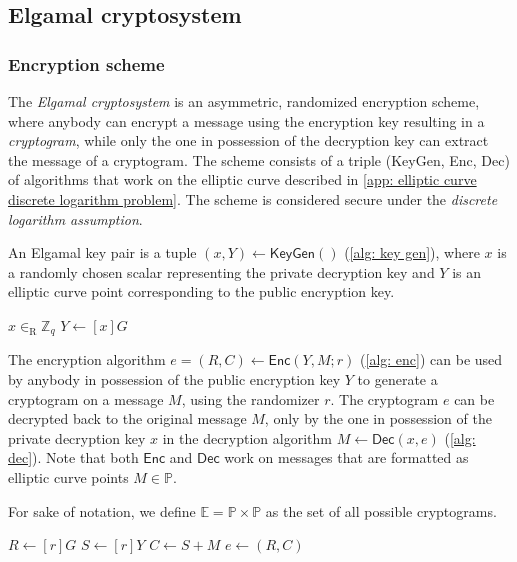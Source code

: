 \subsection{Elgamal cryptosystem} \label{app: elgamal cryptosystem}


\subsubsection{Encryption scheme} \label{app: encryption scheme}
The \textit{Elgamal cryptosystem} is an asymmetric, randomized encryption scheme, where anybody can encrypt a message using the encryption key resulting in a \textit{cryptogram}, while only the one in possession of the decryption key can extract the message of a cryptogram. The scheme consists of a triple (\textsf{KeyGen}, \textsf{Enc}, \textsf{Dec}) of algorithms that work on the elliptic curve described in \cref{app: elliptic curve discrete logarithm problem}. The scheme is considered secure under the \textit{discrete logarithm assumption}.

An Elgamal key pair is a tuple $(x, Y) \gets \mathsf{KeyGen}()$ (\cref{alg: key gen}), where $x$ is a randomly chosen scalar representing the private decryption key and $Y$ is an elliptic curve point corresponding to the public encryption key.

\begin{algorithm}[ht]
    \DontPrintSemicolon
    \caption{$\mathsf{KeyGen}()$}
    \label{alg: key gen}
    
    $x \in_\mathrm{R} \mathbb{Z}_q$ \;
    $Y \gets [x]G$ \;
     
\end{algorithm}

The encryption algorithm $e = (R, C) \gets \mathsf{Enc} (Y, M; r)$ (\cref{alg: enc}) can be used by anybody in possession of the public encryption key $Y$ to generate a cryptogram on a message $M$, using the randomizer $r$. The cryptogram $e$ can be decrypted back to the original message $M$, only by the one in possession of the private decryption key $x$ in the decryption algorithm $M \gets \mathsf{Dec} (x, e)$ (\cref{alg: dec}). Note that both $\mathsf{Enc}$ and $\mathsf{Dec}$ work on messages that are formatted as elliptic curve points $M \in \mathbb{P}$.

For sake of notation, we define $\mathbb{E} = \mathbb{P} \times \mathbb{P}$ as the set of all possible cryptograms.

\begin{algorithm}[ht]
    \DontPrintSemicolon
    \caption{$\mathsf{Enc} (Y, M; r)$}
    \label{alg: enc}
    
    $R \gets [r]G$ \;
    $S \gets [r]Y$ \;
    $C \gets S + M$ \;
    $e \gets (R, C)$ \;
     
\end{algorithm}

